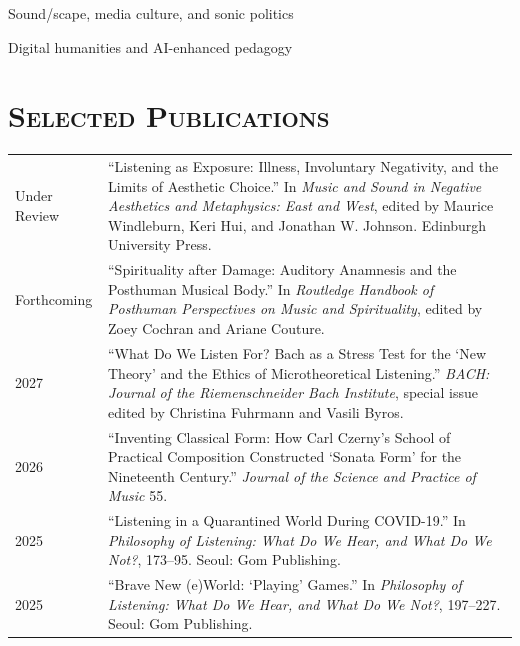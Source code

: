 \documentclass[a4paper,11pt,draft]{article}
\begin{document}
  \noindent \hspace{2mm} \textbullet \hspace{2mm} Sound/scape, media culture, and sonic politics
  
  \noindent \hspace{2mm} \textbullet \hspace{2mm} Digital humanities and AI-enhanced pedagogy
  
  \vspace{2.5mm}
  
  \section*{\textsc{Selected Publications}}
  \hspace*{-0.25cm}
  \begin{tabular}{p{2.5cm} p{12.5cm}}
  	Under Review & ``Listening as Exposure: Illness, Involuntary Negativity, and
the Limits of Aesthetic Choice.'' In \textit{Music and Sound in Negative Aesthetics and Metaphysics: East and West}, edited by Maurice Windleburn, Keri Hui, and Jonathan W. Johnson. Edinburgh University Press.\\[2mm]
  	
    Forthcoming & ``Spirituality after Damage: Auditory Anamnesis and the Posthuman Musical Body.'' In \textit{Routledge Handbook of Posthuman Perspectives on Music and Spirituality}, edited by Zoey Cochran and Ariane Couture.\\[2mm]
    
    2027 & ``What Do We Listen For? Bach as a Stress Test for the `New Theory' and the Ethics of Microtheoretical Listening.'' \textit{BACH: Journal of the Riemenschneider Bach Institute}, special issue edited by Christina Fuhrmann and Vasili Byros.\\[2mm]
    
    2026 & ``Inventing Classical Form: How Carl Czerny's School of Practical Composition Constructed `Sonata Form' for the Nineteenth Century.'' \textit{Journal of the Science and Practice of Music} 55.\\[2mm]
    
    2025 & ``Listening in a Quarantined World During COVID-19.'' In \textit{Philosophy of Listening: What Do We Hear, and What Do We Not?}, 173--95. Seoul: Gom Publishing.\\[2mm]
    
    2025 & ``Brave New (e)World: `Playing' Games.'' In \textit{Philosophy of Listening: What Do We Hear, and What Do We Not?}, 197--227. Seoul: Gom Publishing.\\[2mm]
    

\end{tabular}
\end{document}

